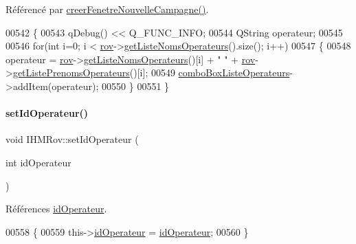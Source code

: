 Référencé par \hyperlink{class_i_h_m_rov_a08bf623a890df272f738c1ff8631213f}{creer\+Fenetre\+Nouvelle\+Campagne()}.


\begin{DoxyCode}
00542 \{
00543     qDebug() << Q\_FUNC\_INFO;
00544     QString operateur;
00545 
00546     \textcolor{keywordflow}{for}(\textcolor{keywordtype}{int} i=0; i < \hyperlink{class_i_h_m_rov_a777ca33fdb295ba6b6773e880356fa1e}{rov}->\hyperlink{class_rov_ab585cb1f82344ba0a64a28488910b262}{getListeNomsOperateurs}().size(); i++)
00547     \{
00548         operateur = \hyperlink{class_i_h_m_rov_a777ca33fdb295ba6b6773e880356fa1e}{rov}->\hyperlink{class_rov_ab585cb1f82344ba0a64a28488910b262}{getListeNomsOperateurs}()[i] + \textcolor{stringliteral}{" "} + 
      \hyperlink{class_i_h_m_rov_a777ca33fdb295ba6b6773e880356fa1e}{rov}->\hyperlink{class_rov_a128cae6dc19025017dea26663adde765}{getListePrenomsOperateurs}()[i];
00549         \hyperlink{class_i_h_m_rov_a32ee4423982fa3a78e59167ed2354f6e}{comboBoxListeOperateurs}->addItem(operateur);
00550     \}
00551 \}
\end{DoxyCode}
\mbox{\label{class_i_h_m_rov_a021be212b27d0c4a08e14695521aacbc}} 
\paragraph{\texorpdfstring{set\+Id\+Operateur()}{setIdOperateur()}}
{\footnotesize\ttfamily void I\+H\+M\+Rov\+::set\+Id\+Operateur (\begin{DoxyParamCaption}\item[{int}]{id\+Operateur }\end{DoxyParamCaption})\hspace{0.3cm}{\ttfamily [private]}}



Références \hyperlink{class_i_h_m_rov_a110af5c174e9fbba12bffbe0301ed690}{id\+Operateur}.


\begin{DoxyCode}
00558 \{
00559     this->\hyperlink{class_i_h_m_rov_a110af5c174e9fbba12bffbe0301ed690}{idOperateur} = \hyperlink{class_i_h_m_rov_a110af5c174e9fbba12bffbe0301ed690}{idOperateur};
00560 \}
\end{DoxyCode}
\mbox{\label{class_i_h_m_rov_a4a0d3a0741d0669ede732b630eae54c6}} 
